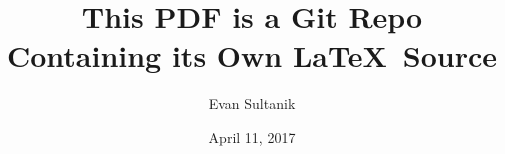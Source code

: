 \documentclass{article}
\begin{document}
\title{This PDF is a Git Repo\\Containing its Own \LaTeX\ Source}
\author{Evan Sultanik}
\date{April 11, 2017}

\maketitle
\end{document}
